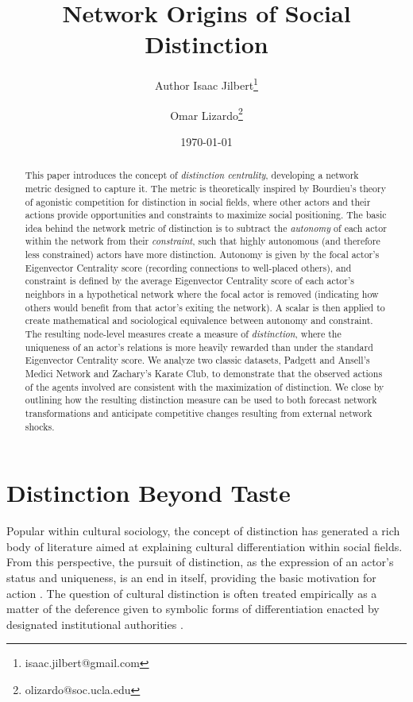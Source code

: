 \documentclass[12pt]{article}
\begin{document}
\title{Network Origins of Social Distinction}
\author[1]{Author Isaac Jilbert\thanks{isaac.jilbert@gmail.com}}
\author[1]{Omar Lizardo\thanks{olizardo@soc.ucla.edu}}

\renewcommand\Authands{ and }

\date{\normalsize \today}	
\maketitle

\newpage
\begin{abstract}	
This paper introduces the concept of \textit{distinction centrality}, developing a network metric designed to capture it. The metric is theoretically inspired by Bourdieu's theory of agonistic competition for distinction in social fields, where other actors and their actions provide opportunities and constraints to maximize social positioning. The basic idea behind the network metric of distinction is to subtract the \textit{autonomy} of each actor within the network from their \textit{constraint}, such that highly autonomous (and therefore less constrained) actors have more distinction. Autonomy is given by the focal actor's Eigenvector Centrality score (recording connections to well-placed others), and constraint is defined by the average Eigenvector Centrality score of each actor's neighbors in a hypothetical network where the focal actor is removed (indicating how others would benefit from that actor's exiting the network). A scalar is then applied to create mathematical and sociological equivalence between autonomy and constraint. The resulting node-level measures create a measure of \textit{distinction}, where the uniqueness of an actor's relations is more heavily rewarded than under the standard Eigenvector Centrality score. We analyze two classic datasets, Padgett and Ansell's \citeyearpar{padgett1993robust} Medici Network and Zachary's \citeyearpar{zachary1977information} Karate Club, to demonstrate that the observed actions of the agents involved are consistent with the maximization of distinction. We close by outlining how the resulting distinction measure can be used to both forecast network transformations and anticipate competitive changes resulting from external network shocks.    
\end{abstract}

\newpage
\section{Distinction Beyond Taste}
Popular within cultural sociology, the concept of distinction has generated a rich body of literature aimed at explaining cultural differentiation within social fields. From this perspective, the pursuit of distinction, as the expression of an actor's status and uniqueness, is an end in itself, providing the basic motivation for action \citep{martin2003field}. The question of cultural distinction is often treated empirically as a matter of the deference given to symbolic forms of differentiation enacted by designated institutional authorities \citep{bourdieu1984distinction}. 
\end{document}
